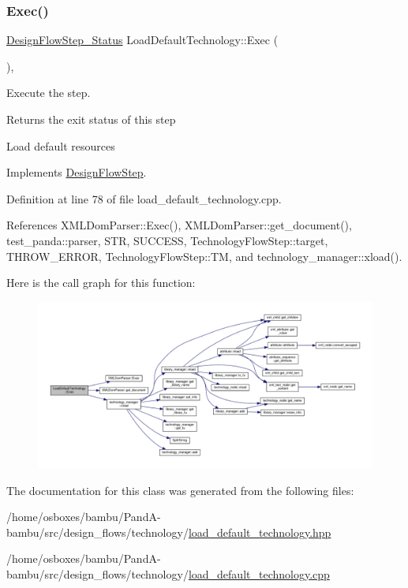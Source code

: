 \subsubsection{\texorpdfstring{Exec()}{Exec()}}
{\footnotesize\ttfamily \hyperlink{design__flow__step_8hpp_afb1f0d73069c26076b8d31dbc8ebecdf}{Design\+Flow\+Step\+\_\+\+Status} Load\+Default\+Technology\+::\+Exec (\begin{DoxyParamCaption}{ }\end{DoxyParamCaption})\hspace{0.3cm}{\ttfamily [override]}, {\ttfamily [virtual]}}



Execute the step. 

\begin{DoxyReturn}{Returns}
the exit status of this step 
\end{DoxyReturn}
Load default resources 

Implements \hyperlink{classDesignFlowStep_a77d7e38493016766098711ea24f60b89}{Design\+Flow\+Step}.



Definition at line 78 of file load\+\_\+default\+\_\+technology.\+cpp.



References X\+M\+L\+Dom\+Parser\+::\+Exec(), X\+M\+L\+Dom\+Parser\+::get\+\_\+document(), test\+\_\+panda\+::parser, S\+TR, S\+U\+C\+C\+E\+SS, Technology\+Flow\+Step\+::target, T\+H\+R\+O\+W\+\_\+\+E\+R\+R\+OR, Technology\+Flow\+Step\+::\+TM, and technology\+\_\+manager\+::xload().

Here is the call graph for this function\+:
\nopagebreak
\begin{figure}[H]
\begin{center}
\leavevmode
\includegraphics[width=350pt]{d2/d1e/classLoadDefaultTechnology_ad3943a87c0ecb17d3823a40c4e959df6_cgraph}
\end{center}
\end{figure}


The documentation for this class was generated from the following files\+:\begin{DoxyCompactItemize}
\item 
/home/osboxes/bambu/\+Pand\+A-\/bambu/src/design\+\_\+flows/technology/\hyperlink{load__default__technology_8hpp}{load\+\_\+default\+\_\+technology.\+hpp}\item 
/home/osboxes/bambu/\+Pand\+A-\/bambu/src/design\+\_\+flows/technology/\hyperlink{load__default__technology_8cpp}{load\+\_\+default\+\_\+technology.\+cpp}\end{DoxyCompactItemize}
